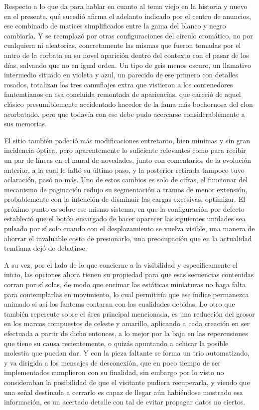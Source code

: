\documentclass[
]{book}
\begin{document}
Respecto a lo que da para hablar en cuanto al tema viejo en la historia y nuevo en el presente, qué sucedió afirma el adelanto indicado por el centro de anuncios, ese combinado de matices simplificados entre la gama del blanco y negro cambiaría. Y se reemplazó por otras configuraciones del círculo cromático, no por cualquiera ni aleatorias, concretamente las mismas que fueron tomadas por el antro de la corbata en su novel aparición dentro del contexto con el pasar de los días, salvando que no en igual orden. Un tipo de gris menos oscuro, un llamativo intermedio situado en violeta y azul, un parecido de ese primero con detalles rosados, totalizan los tres camuflajes extra que vistieron a los contenedores fantemtianos en esa concluida remontada de apariencias, que careció de aquel clásico presumiblemente accidentado hacedor de la fama más bochornosa del clon acorbatado, pero que todavía con ese debe pudo acercarse considerablemente a sus memorias.

El sitio también padeció más modificaciones entretanto, bien mínimas y sin gran incidencia óptica, pero aparentemente lo suficiente relevantes como para recibir un par de líneas en el mural de novedades, junto con comentarios de la evolución anterior, a la cual le faltó su último paso, y la posterior retirada tampoco tuvo aclaración, pasó no más. Uno de estos cambios es solo de cifras, el funcionar del mecanismo de paginación redujo su segmentación a tramos de menor extensión, probablemente con la intención de disminuir las cargas excesivas, optimizar. El próximo punto es sobre ese mismo sistema, en que la configuración por defecto estableció que el botón encargado de hacer aparecer las siguientes unidades sea pulsado por sí solo cuando con el desplazamiento se vuelva visible, una manera de ahorrar el invaluable costo de presionarlo, una preocupación que en la actualidad temtiana dejó de debatirse.

A su vez, por el lado de lo que concierne a la visibilidad y específicamente el inicio, las opciones ahora tienen su propiedad para que esas secuencias contenidas corran por sí solas, de modo que encimar las estáticas miniaturas no haga falta para contemplarlas en movimiento, lo cual permitiría que ese índice permanezca animado si así los fantems contaran con las cualidades debidas. Lo otro que también repercute sobre el área principal mencionada, es una reducción del grosor en los marcos compuestos de celeste y amarillo, aplicando a cada creación en ser efectuada a partir de dicho entonces, a lo mejor por la baja en las repercusiones que tiene su causa recientemente, o quizás apuntando a achicar la posible molestia que puedan dar. Y con la pieza faltante se forma un trio automatizado, y va dirigida a los mensajes de desconexión, que en poco tiempo de ser implementados cumplieron con su finalidad, sin embargo por lo visto no consideraban la posibilidad de que el visitante pudiera recuperarla, y viendo que una señal destinada a cerrarlo es capaz de llegar aún habiéndose mostrado esa información, es un acertado detalle con tal de evitar propagar datos no ciertos.
\end{document}
